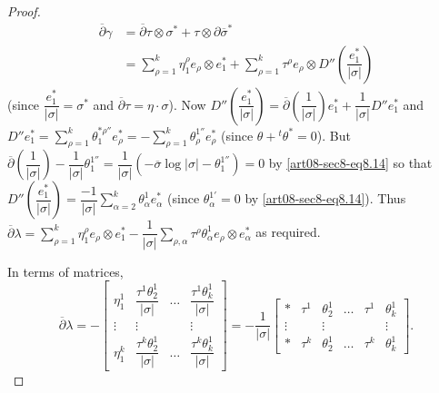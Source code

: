 \begin{proof}
\begin{align*}
\overline{\partial}\gamma &= \overline{\partial}\tau \otimes \sigma^{*}+\tau\otimes \partial \overline{\sigma}^{*}\\
&= \sum\limits^{k}_{\rho=1}\eta^{\rho}_{1}e_{\rho}\otimes e^{*}_{1}+\sum\limits^{k}_{\rho=1}\tau^{\rho}e_{\rho}\otimes D''\left(\dfrac{e^{*}_{1}}{|\sigma|}\right)
\end{align*}
(since $\dfrac{e^{*}_{1}}{|\sigma|}=\sigma^{*}$ and $\overline{\partial}\tau=\eta\cdot \sigma$). Now $D''\left(\dfrac{e^{*}_{1}}{|\sigma|}\right)=\overline{\partial}\left(\dfrac{1}{|\sigma|}\right)e^{*}_{1}+\dfrac{1}{|\sigma|}D''e^{*}_{1}$ and $D''e^{*}_{1}=\sum\limits^{k}_{\rho=1}\theta^{*\rho''}_{1}e^{*}_{\rho}=-\sum\limits^{k}_{\rho=1}\theta^{1''}_{\rho}e^{*}_{\rho}$ (since $\theta+{}^{t}\theta^{*}=0$). But $\overline{\partial}\left(\dfrac{1}{|\sigma|}\right)-\dfrac{1}{|\sigma|}\theta^{1''}_{1}=\dfrac{1}{|\sigma|}(-\overline{\sigma}\log |\sigma|-\theta^{1''}_{1})=0$ by \eqref{art08-sec8-eq8.14} so that $D''\left(\dfrac{e^{*}_{1}}{|\sigma|}\right)=\dfrac{-1}{|\sigma|}\sum\limits^{k}_{\alpha=2}\theta^{1}_{\alpha}e^{*}_{\alpha}$ (since $\theta^{1'}_{\alpha}=0$ by \eqref{art08-sec8-eq8.14}). Thus $\overline{\partial}\lambda=\sum\limits^{k}_{\rho=1}\eta^{\rho}_{1}e_{\rho}\otimes e^{*}_{1}-\dfrac{1}{|\sigma|}\sum\limits_{\rho,\alpha}\tau^{\rho}\theta^{1}_{\alpha}e_{\rho}\otimes e^{*}_{\alpha}$ as required.

In terms of matrices,
\begin{equation}
\overline{\partial}\lambda=-
\begin{bmatrix}
\eta^{1}_{1} & \dfrac{\tau^{1}\theta^{1}_{2}}{|\sigma|} & \ldots & \dfrac{\tau^{1}\theta^{1}_{k}}{|\sigma|}\\
\vdots & \vdots & & \vdots\\
\eta^{k}_{1} & \dfrac{\tau^{k}\theta^{1}_{2}}{|\sigma|} & \ldots & \dfrac{\tau^{k}\theta^{1}_{k}}{|\sigma|}
\end{bmatrix}
=-\dfrac{1}{|\sigma|}
\begin{bmatrix}
* & \tau^{1} & \theta^{1}_{2} & \ldots & \tau^{1} & \theta^{1}_{k}\\
\vdots & & \vdots & & & \vdots\\
* & \tau^{k} & \theta^{1}_{2} & \ldots & \tau^{k} & \theta^{1}_{k}
\end{bmatrix}.\label{art08-sec8-eq8.21}
\end{equation}
\end{proof}

